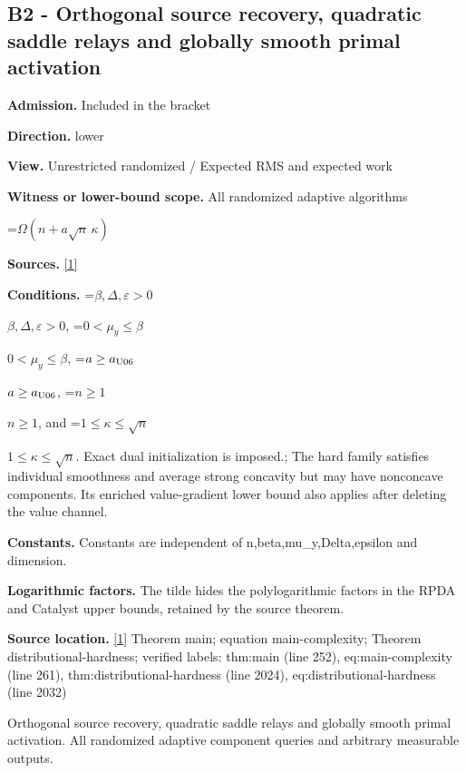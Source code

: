 \documentclass[10pt,a4paper]{article}
\newcommand{\AtlasMath}[1]{\par\begingroup\centering\setbox0=\hbox{$\displaystyle #1$}\ifdim\wd0>1.4\linewidth\typeout{ATLAS WIDE FORMULA: \the\wd0}\fi\ifdim\wd0>\linewidth\resizebox{\linewidth}{!}{\box0}\else\box0\fi\par\endgroup}
\newcommand{\AtlasInlineMath}[1]{\begingroup\setbox0=\hbox{$#1$}\ifdim\wd0>.4\linewidth\endgroup\AtlasMath{#1}\else\endgroup$#1$\fi}
\begin{document}
\subsection{B2 - Orthogonal source recovery, quadratic saddle relays and globally smooth primal activation}


\textbf{Admission.} Included in the bracket



\textbf{Direction.} lower



\textbf{View.} Unrestricted randomized / Expected RMS and expected work



\textbf{Witness or lower-bound scope.} All randomized adaptive algorithms



\AtlasMath{\Omega(n+a\sqrt n\,\kappa)}


\textbf{Sources.} \href{https://github.com/WU-Wendao/Colombo/blob/main/colombo_sensorium/Complexity_altas/data/sources/colombo/U06/manuscript.pdf}{[1]}



\textbf{Conditions.} \AtlasInlineMath{\beta,\Delta,\varepsilon>0}, \AtlasInlineMath{0<\mu_y\le\beta}, \AtlasInlineMath{a\ge a_{\rm U06}}, \AtlasInlineMath{n\ge1}, and \AtlasInlineMath{1\le\kappa\le\sqrt n}. Exact dual initialization is imposed.; The hard family satisfies individual smoothness and average strong concavity but may have nonconcave components. Its enriched value-gradient lower bound also applies after deleting the value channel.



\textbf{Constants.} Constants are independent of n,beta,mu\_y,Delta,epsilon and dimension.



\textbf{Logarithmic factors.} The tilde hides the polylogarithmic factors in the RPDA and Catalyst upper bounds, retained by the source theorem.



\textbf{Source location.} \href{https://github.com/WU-Wendao/Colombo/blob/main/colombo_sensorium/Complexity_altas/data/sources/colombo/U06/manuscript.pdf}{[1]} Theorem main; equation main-complexity; Theorem distributional-hardness; verified labels: thm:main (line 252), eq:main-complexity (line 261), thm:distributional-hardness (line 2024), eq:distributional-hardness (line 2032)



Orthogonal source recovery, quadratic saddle relays and globally smooth primal activation. All randomized adaptive component queries and arbitrary measurable outputs.
\end{document}

